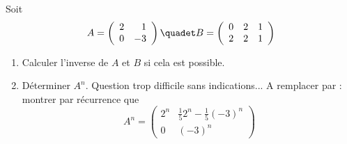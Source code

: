 \documentclass[a4paper, 11pt,reqno]{article}
\begin{document}
\begin{exercice}
Soit $$A=\left(\begin{array}{rr} 2&1\\0&-3 \end{array}\right) \quadet B=\left(\begin{array}{rrr} 0&2&1\\2&2&1 \end{array}\right)$$
\begin{enumerate}
\item Calculer l'inverse de $A$ et $B$ si cela est possible. 
\item Déterminer $A^n$. Question trop difficile sans indications... 
 A remplacer par  : montrer par récurrence que 
$$A^n = \left(\begin{array}{rc} 2^n&\frac{1}{5}2^n - \frac{1}{5}(-3)^n\\0&(-3)^n \end{array}\right) $$
\end{enumerate}
\end{exercice}
\end{document}

